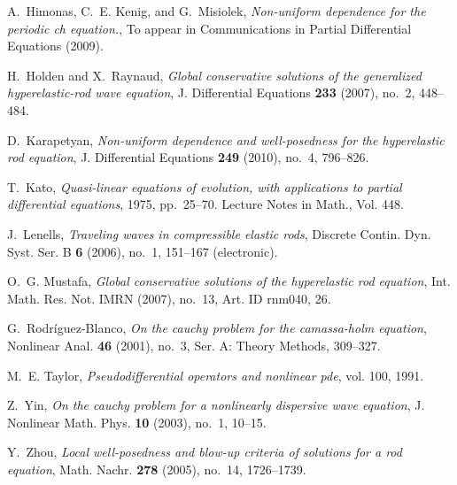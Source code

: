\documentclass[12pt,reqno]{amsart}
\numberwithin{equation}{section}  %
\numberwithin{figure}{section}
\begin{document}
\begin{thebibliography}{HKM09}
A.~Himonas, C.~E. Kenig, and G.~Misiolek, \emph{Non-uniform dependence for the
  periodic ch equation.}, To appear in Communications in Partial Differential
  Equations (2009).

H.~Holden and X.~Raynaud, \emph{Global conservative solutions of the
  generalized hyperelastic-rod wave equation}, J. Differential Equations
  \textbf{233} (2007), no.~2, 448--484.

D.~Karapetyan, \emph{Non-uniform dependence and well-posedness for the
  hyperelastic rod equation}, J. Differential Equations \textbf{249} (2010),
  no.~4, 796--826.

T.~Kato, \emph{Quasi-linear equations of evolution, with applications to
  partial differential equations}, 1975, pp.~25--70. Lecture Notes in Math.,
  Vol. 448.

J.~Lenells, \emph{Traveling waves in compressible elastic rods}, Discrete
  Contin. Dyn. Syst. Ser. B \textbf{6} (2006), no.~1, 151--167 (electronic).

O.~G. Mustafa, \emph{Global conservative solutions of the hyperelastic rod
  equation}, Int. Math. Res. Not. IMRN (2007), no.~13, Art. ID rnm040, 26.

G.~Rodr\'iguez-Blanco, \emph{On the cauchy problem for the camassa-holm
  equation}, Nonlinear Anal. \textbf{46} (2001), no.~3, Ser. A: Theory Methods,
  309--327.

M.~E. Taylor, \emph{Pseudodifferential operators and nonlinear pde}, vol. 100,
  1991.

Z.~Yin, \emph{On the cauchy problem for a nonlinearly dispersive wave
  equation}, J. Nonlinear Math. Phys. \textbf{10} (2003), no.~1, 10--15.

Y.~Zhou, \emph{Local well-posedness and blow-up criteria of solutions for a rod
  equation}, Math. Nachr. \textbf{278} (2005), no.~14, 1726--1739.

\end{thebibliography}
%
%
%
%
%
%
%
%
%
\end{document}
